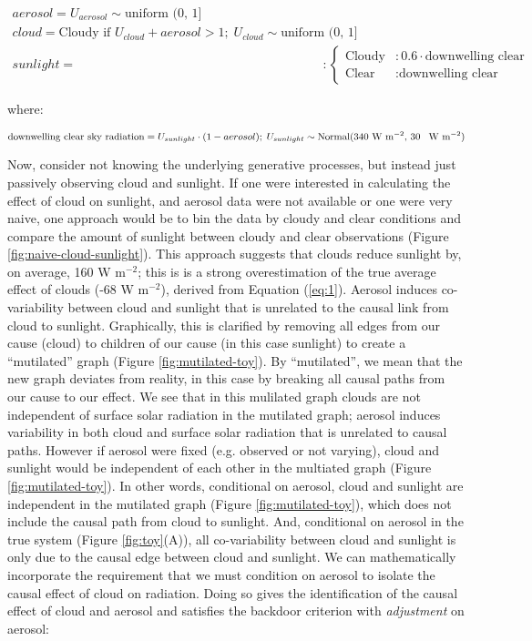 \documentclass[12pt]{article}
\begin{document}
\begin{align}
  aerosol = U_{aerosol} \sim \text{uniform (0, 1]}\\
  cloud = \text{Cloudy if } U_{cloud} + aerosol > 1; \;
  U_{cloud} \sim \text{uniform (0, 1]}\\
  sunlight = &: \begin{cases}
    \text{Cloudy} &: 0.6 \cdot \text{downwelling clear sky radiation}  \\
    \text{Clear} &: \text{downwelling clear sky radiation}
  \end{cases}
\end{align}

where:

\begin{equation*}
  \text{downwelling clear sky radiation} = U_{sunlight} \cdot (1 - aerosol); \;
  U_{sunlight} \sim \text{Normal(340 W m$^{-2}$, 30 \, W m$^{-2}$)}
\end{equation*}

Now, consider not knowing the underlying generative processes, but
instead just passively observing cloud and sunlight. If one were
interested in calculating the effect of cloud on sunlight, and aerosol
data were not available or one were very naive, one approach would be
to bin the data by cloudy and clear conditions and compare the amount
of sunlight between cloudy and clear observations (Figure
\ref{fig:naive-cloud-sunlight}). This approach suggests that clouds
reduce sunlight by, on average, 160 W m$^{-2}$; this is is a strong
overestimation of the true average effect of clouds (-68 W m$^{-2}$),
derived from Equation (\ref{eq:1}). Aerosol induces co-variability
between cloud and sunlight that is unrelated to the causal link from
cloud to sunlight. Graphically, this is clarified by removing all
edges from our cause (cloud) to children of our cause (in this case
sunlight) to create a ``mutilated'' graph (Figure
\ref{fig:mutilated-toy}). By ``mutilated'', we mean that the new graph
deviates from reality, in this case by breaking all causal paths from
our cause to our effect. We see that in this mulilated graph clouds
are not independent of surface solar radiation in the mutilated graph;
aerosol induces variability in both cloud and surface solar radiation
that is unrelated to causal paths.  However if aerosol were fixed
(e.g. observed or not varying), cloud and sunlight would be
independent of each other in the multiated graph (Figure
\ref{fig:mutilated-toy}). In other words, conditional on aerosol,
cloud and sunlight are independent in the mutilated graph (Figure
\ref{fig:mutilated-toy}), which does not include the causal path from
cloud to sunlight. And, conditional on aerosol in the true system
(Figure \ref{fig:toy}(A)), all co-variability between cloud and
sunlight is only due to the causal edge between cloud and sunlight.
We can mathematically incorporate the requirement that we must
condition on aerosol to isolate the causal effect of cloud on
radiation. Doing so gives the identification of the causal effect of
cloud and aerosol and satisfies the backdoor criterion with
\textit{adjustment} on aerosol:
\end{document}
